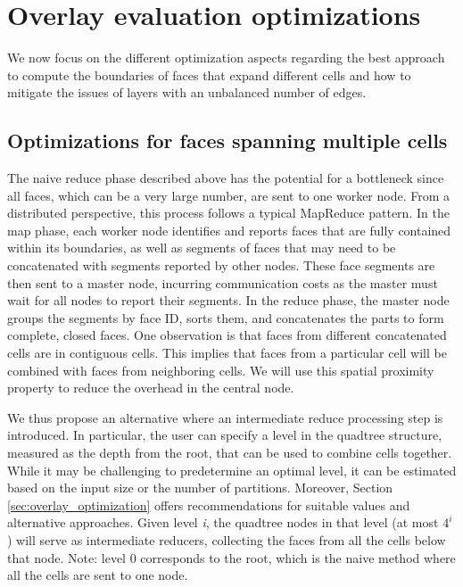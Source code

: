 \section{Overlay evaluation optimizations}\label{sec:alternative_methods}
We now focus on the different optimization aspects regarding the best approach to compute the boundaries of faces that expand different cells and how to mitigate the issues of layers with an unbalanced number of edges.

\subsection{Optimizations for faces spanning multiple cells}\label{sec:optimizing}

The naive reduce phase described above has the potential for a bottleneck since all faces, which can be a very large number, are sent to one worker node. 
From a distributed perspective, this process follows a typical MapReduce pattern. In the map phase, each worker node identifies and reports faces that are fully contained within its boundaries, as well as segments of faces that may need to be concatenated with segments reported by other nodes. These face segments are then sent to a master node, incurring communication costs as the master must wait for all nodes to report their segments. In the reduce phase, the master node groups the segments by face ID, sorts them, and concatenates the parts to form complete, closed faces.
One observation is that faces from different concatenated cells are in contiguous cells. This implies that faces from a particular cell will be combined with faces from neighboring cells. We will use this spatial proximity property to reduce the overhead in the central node.

We thus propose an alternative where an intermediate reduce processing step is introduced. In particular, the user can specify a level in the quadtree structure, measured as the depth from the root, that can be used to combine cells together. 
While it may be challenging to predetermine an optimal level, it can be estimated based on the input size or the number of partitions. Moreover, Section \ref{sec:overlay_optimization} offers recommendations for suitable values and alternative approaches.
Given level \textit{i}, the quadtree nodes in that level (at most $4^i$) will serve as intermediate reducers, collecting the faces from all the cells below that node. Note: level 0 corresponds to the root, which is the naive method where all the cells are sent to one node.

